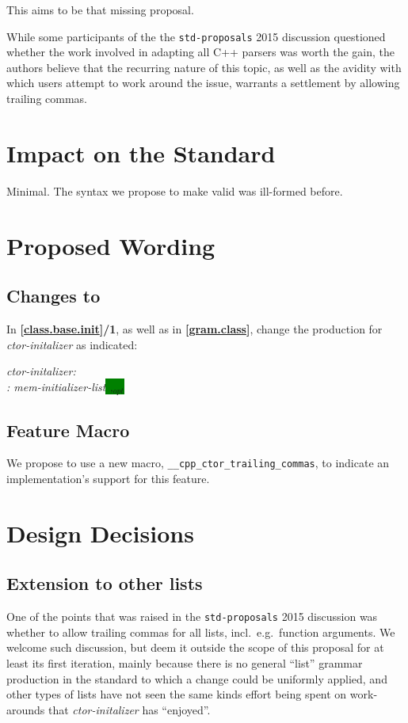 \documentclass[11pt]{article}
\newcommand{\wgpaper}[1]{\href{https://wg21.link/#1}{#1}}
\newcommand{\isref}[1]{\textbf{[\wgpaper{#1}]}}
\newcommand{\isnref}[2]{\textbf{[\href{https://wg21.link/#1\##2}{#1}]/#2}}
\begin{document}
This aims to be that missing proposal.

While some participants of the the \texttt{std-proposals} 2015
discussion questioned whether the work involved in adapting all C++
parsers was worth the gain, the authors believe that the recurring
nature of this topic, as well as the avidity with which users attempt
to work around the issue, warrants a settlement by allowing trailing
commas.

\section{Impact on the Standard}

Minimal. The syntax we propose to make valid was ill-formed before.

\section{Proposed Wording}

\subsection{Changes to \cite{cpp2a}}

In \isnref{class.base.init}1, as well as in \isref{gram.class}, change
the production for \emph{ctor-initalizer} as indicated:

  \emph{
  ctor-initalizer:\\
  \hspace*{1cm}: mem-initializer-list\colorbox{green}{ ,$_{opt}$}
  }

\subsection{Feature Macro}

We propose to use a new macro,
\texttt{\_\_cpp\_ctor\_trailing\_commas}, to indicate an
implementation's support for this feature.

\section{Design Decisions}

\subsection{Extension to other lists}

One of the points that was raised in the \texttt{std-proposals} 2015
discussion was whether to allow trailing commas for all lists,
incl.\ e.g.\ function arguments. We welcome such discussion, but deem
it outside the scope of this proposal for at least its first
iteration, mainly because there is no general ``list'' grammar
production in the standard to which a change could be uniformly
applied, and other types of lists have not seen the same kinds effort
being spent on work-arounds that \emph{ctor-initalizer} has
``enjoyed''.
\end{document}
